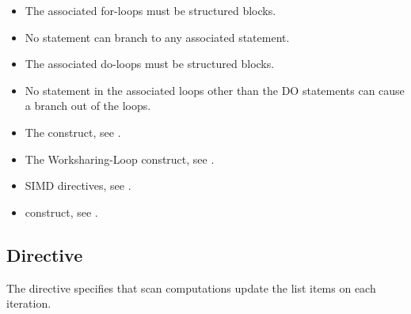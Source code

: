 \begin{ccppspecific}
\begin{itemize}
\item The associated for-loops must be structured blocks.
\item No statement can branch to any associated  statement.
\end{itemize}
\end{ccppspecific}

\begin{fortranspecific}
\begin{itemize}
\item The associated do-loops must be structured blocks.
\item No statement in the associated loops other than the DO statements can cause
      a branch out of the loops.
\end{itemize}
\end{fortranspecific}

\crossreferences
\begin{itemize}
\item The  construct, see .

\item The Worksharing-Loop construct, see .

\item SIMD directives, see .

\item {} construct, see .
\end{itemize}



\subsection{ Directive}
\label{subsec:scan Directive}

\summary
The  directive specifies that scan computations update
the list items on each iteration.

